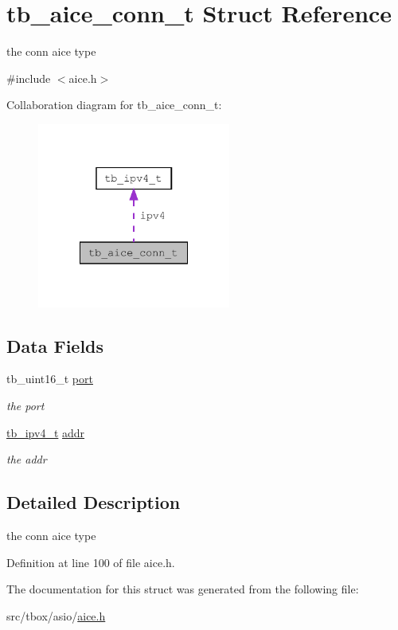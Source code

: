 \hypertarget{structtb__aice__conn__t}{\section{tb\-\_\-aice\-\_\-conn\-\_\-t Struct Reference}
\label{structtb__aice__conn__t}
}


the conn aice type  




{\ttfamily \#include $<$aice.\-h$>$}



Collaboration diagram for tb\-\_\-aice\-\_\-conn\-\_\-t\-:\nopagebreak
\begin{figure}[H]
\begin{center}
\leavevmode
\includegraphics[width=180pt]{d4/d78/structtb__aice__conn__t__coll__graph}
\end{center}
\end{figure}
\subsection*{Data Fields}
\begin{DoxyCompactItemize}
\item 
\hypertarget{structtb__aice__conn__t_a1d2a9423d6633ad1f0de6cc31b516b02}{tb\-\_\-uint16\-\_\-t \hyperlink{structtb__aice__conn__t_a1d2a9423d6633ad1f0de6cc31b516b02}{port}}\label{structtb__aice__conn__t_a1d2a9423d6633ad1f0de6cc31b516b02}

\begin{DoxyCompactList}\small\item\em the port \end{DoxyCompactList}\item 
\hypertarget{structtb__aice__conn__t_a6312bb9a4465cd634f26edf3b038d112}{\hyperlink{uniontb__ipv4__t}{tb\-\_\-ipv4\-\_\-t} \hyperlink{structtb__aice__conn__t_a6312bb9a4465cd634f26edf3b038d112}{addr}}\label{structtb__aice__conn__t_a6312bb9a4465cd634f26edf3b038d112}

\begin{DoxyCompactList}\small\item\em the addr \end{DoxyCompactList}\end{DoxyCompactItemize}


\subsection{Detailed Description}
the conn aice type 

Definition at line 100 of file aice.\-h.



The documentation for this struct was generated from the following file\-:\begin{DoxyCompactItemize}
\item 
src/tbox/asio/\hyperlink{aice_8h}{aice.\-h}\end{DoxyCompactItemize}
